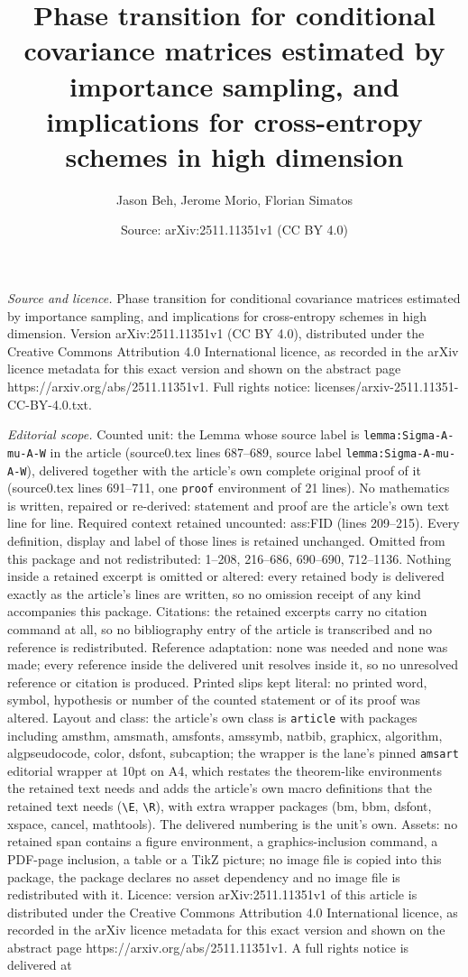 \documentclass[10pt,a4paper]{amsart}
\title[Phase transition for conditional covariance matrices estimat]{Phase transition for conditional covariance matrices estimated by importance sampling, and implications for cross-entropy schemes in high dimension}
\author{Jason Beh, Jerome Morio, Florian Simatos}
\date{Source: arXiv:2511.11351v1 (CC BY 4.0)}
\begin{document}
\maketitle

\noindent\emph{Source and licence.} Phase transition for conditional covariance matrices estimated by importance sampling, and implications for cross-entropy schemes in high dimension. Version arXiv:2511.11351v1 (CC BY 4.0), distributed under the Creative Commons Attribution 4.0 International licence, as recorded in the arXiv licence metadata for this exact version and shown on the abstract page https://arxiv.org/abs/2511.11351v1. Full rights notice: licenses/arxiv-2511.11351-CC-BY-4.0.txt.\par\smallskip

\noindent\textit{Editorial scope.} Counted unit: the Lemma whose source label is \texttt{lemma:Sigma-A-mu-A-W} in the article (source0.tex lines 687--689, source label \texttt{lemma:Sigma-A-mu-A-W}), delivered together with the article's own complete original proof of it (source0.tex lines 691--711, one \texttt{proof} environment of 21 lines). No mathematics is written, repaired or re-derived: statement and proof are the article's own text line for line. Required context retained uncounted: ass:FID (lines 209--215). Every definition, display and label of those lines is retained unchanged. Omitted from this package and not redistributed: 1--208, 216--686, 690--690, 712--1136. Nothing inside a retained excerpt is omitted or altered: every retained body is delivered exactly as the article's lines are written, so no omission receipt of any kind accompanies this package. Citations: the retained excerpts carry no citation command at all, so no bibliography entry of the article is transcribed and no reference is redistributed. Reference adaptation: none was needed and none was made; every reference inside the delivered unit resolves inside it, so no unresolved reference or citation is produced. Printed slips kept literal: no printed word, symbol, hypothesis or number of the counted statement or of its proof was altered. Layout and class: the article's own class is \texttt{article} with packages including amsthm, amsmath, amsfonts, amssymb, natbib, graphicx, algorithm, algpseudocode, color, dsfont, subcaption; the wrapper is the lane's pinned \texttt{amsart} editorial wrapper at 10pt on A4, which restates the theorem-like environments the retained text needs and adds the article's own macro definitions that the retained text needs (\texttt{\textbackslash E}, \texttt{\textbackslash R}), with extra wrapper packages (bm, bbm, dsfont, xspace, cancel, mathtools). The delivered numbering is the unit's own. Assets: no retained span contains a figure environment, a graphics-inclusion command, a PDF-page inclusion, a table or a TikZ picture; no image file is copied into this package, the package declares no asset dependency and no image file is redistributed with it. Licence: version arXiv:2511.11351v1 of this article is distributed under the Creative Commons Attribution 4.0 International licence, as recorded in the arXiv licence metadata for this exact version and shown on the abstract page https://arxiv.org/abs/2511.11351v1. A full rights notice is delivered at 
\end{document}
